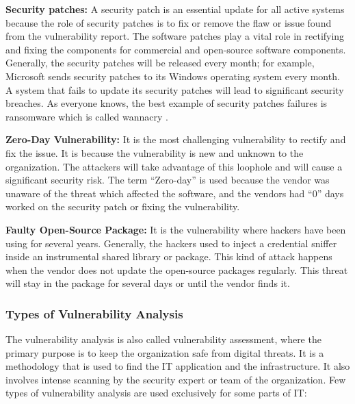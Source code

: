 	\textbf{Security patches:} A security patch is an essential update for all active systems because the role of security patches is to fix or remove the flaw or issue found from the vulnerability report. The software patches play a vital role in rectifying and fixing the components for commercial and open-source software components. Generally, the security patches will be released every month; for example, Microsoft sends security patches to its Windows operating system every month. A system that fails to update its security patches will lead to significant security breaches. As everyone knows, the best example of security patches failures is ransomware which is called wannacry \cite{Kaspersky}.
	
	\textbf{Zero-Day Vulnerability:} It is the most challenging vulnerability to rectify and fix the issue. It is because the vulnerability is new and unknown to the organization. The attackers will take advantage of this loophole and will cause a significant security risk. The term “Zero-day” is used because the vendor was unaware of the threat which affected the software, and the vendors had “0” days worked on the security patch or fixing the vulnerability.
	
	\textbf{Faulty Open-Source Package:} It is the vulnerability where hackers have been using for several years. Generally, the hackers used to inject a credential sniffer inside an instrumental shared library or package. This kind of attack happens when the vendor does not update the open-source packages regularly. This threat will stay in the package for several days or until the vendor finds it.


\subsubsection{Types of Vulnerability Analysis}
The vulnerability analysis is also called vulnerability assessment, where the primary purpose is to keep the organization safe from digital threats. It is a methodology that is used to find the IT application and the infrastructure. It also involves intense scanning by the security expert or team of the organization. Few types of vulnerability analysis are used exclusively for some parts of IT:

